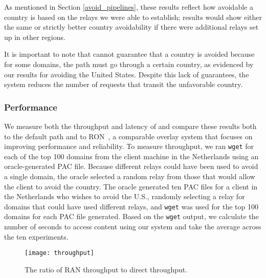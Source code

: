 As mentioned in Section \ref{avoid_pipelines}, these results reflect how avoidable a country 
is based on the relays we were able to establish; results would show either the same or strictly 
better country avoidability if there were additional relays set up in other regions.

It is important to note that \system{} cannot guarantee that a country is 
avoided because for some domains, the path must go through a certain 
country, as evidenced by our results for avoiding the United States.  Despite 
this lack of guarantees, the system reduces the number of requests that 
transit the unfavorable country.  

\subsubsection{Performance}
We measure both 
the throughput and latency of \system{} and compare these results both to the default
path and to RON~\cite{andersen2001resilient}, a comparable overlay system that focuses
on improving performance and reliability.
To measure throughput, we ran {\tt wget} for each 
of the top 100 domains from the client machine in the Netherlands 
using an oracle-generated PAC file.  Because different relays could have been 
used to avoid a single domain, the oracle selected a random relay from those 
that would allow the client to avoid the country.  The oracle generated 
ten PAC files for a client in the Netherlands who wishes to avoid the U.S.,
 randomly selecting a relay for domains that could have used 
different relays, and {\tt wget} was used for the top 100 domains for each 
PAC file generated.  Based on the {\tt wget} output, we calculate the number 
of seconds to access content using our system and take the average across the 
ten experiments. 

\begin{figure}[t]
\centering
\texttt{[image: throughput]}
\caption{The ratio of RAN throughput to direct throughput. } 
\label{fig:throughput}
\end{figure}

